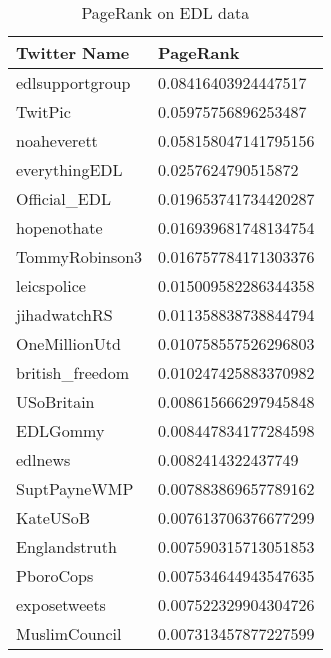 \begin{table}%
\centering
\begin{tabular}{|l|l|}
\hline
Twitter Name & PageRank \\
\hline
edlsupportgroup & 0.08416403924447517 \\
TwitPic & 0.05975756896253487 \\
noaheverett & 0.058158047141795156 \\
everythingEDL & 0.0257624790515872 \\
Official\_EDL & 0.019653741734420287 \\
hopenothate & 0.016939681748134754 \\
TommyRobinson3 & 0.016757784171303376 \\
leicspolice & 0.015009582286344358 \\
jihadwatchRS & 0.011358838738844794 \\
OneMillionUtd & 0.010758557526296803 \\
british\_freedom & 0.010247425883370982 \\
USoBritain & 0.008615666297945848 \\
EDLGommy & 0.008447834177284598 \\
edlnews & 0.0082414322437749 \\
SuptPayneWMP & 0.007883869657789162 \\
KateUSoB & 0.007613706376677299 \\
Englandstruth & 0.007590315713051853 \\
PboroCops & 0.007534644943547635 \\
exposetweets & 0.007522329904304726 \\
MuslimCouncil & 0.007313457877227599 \\
\hline
\end{tabular}
\caption{PageRank on EDL data}
\label{tab:edlpagerank}
\end{table}

